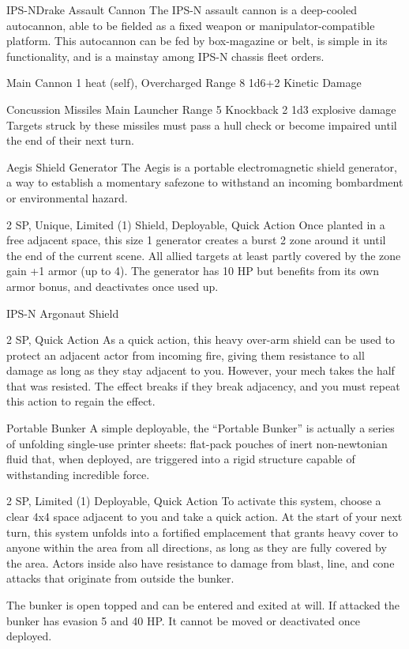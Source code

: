 \begin{mech}{IPS-N}{Drake}
Assault Cannon
The IPS-N assault cannon is a deep-cooled autocannon, able to be fielded as a fixed weapon or manipulator-compatible platform. This autocannon can be fed by box-magazine or belt, is simple in its functionality, and is a mainstay among IPS-N chassis fleet orders.

Main Cannon
1 heat (self), Overcharged
Range 8
1d6+2 Kinetic Damage

Concussion Missiles
Main Launcher
Range 5
Knockback 2
1d3 explosive damage
Targets struck by these missiles must pass a hull check or become impaired until the end of their next turn.

Aegis Shield Generator
The Aegis is a portable electromagnetic shield generator, a way to establish a momentary safezone to withstand an incoming bombardment or environmental hazard.

2 SP, Unique, Limited (1)
Shield, Deployable, Quick Action
Once planted in a free adjacent space, this size 1 generator creates a burst 2 zone around it until the end of the current scene. All allied targets at least partly covered by the zone gain +1 armor (up to 4). The generator has 10 HP but benefits from its own armor bonus, and deactivates once used up.

IPS-N Argonaut Shield

2 SP, Quick Action
As a quick action, this heavy over-arm shield can be used to protect an adjacent actor from incoming fire, giving them resistance to all damage as long as they stay adjacent to you. However, your mech takes the half that was resisted. The effect breaks if they break adjacency, and you must repeat this action to regain the effect.

Portable Bunker
A simple deployable, the “Portable Bunker” is actually a series of unfolding single-use printer sheets: flat-pack pouches of inert non-newtonian fluid that, when deployed, are triggered into a rigid structure capable of withstanding incredible force.

2 SP, Limited (1)
Deployable, Quick Action
To activate this system, choose a clear 4x4 space adjacent to you and take a quick action. At the start of your next turn, this system unfolds into a fortified emplacement that grants heavy cover to anyone within the area from all directions, as long as they are fully covered by the area. Actors inside also have resistance to damage from blast, line, and cone attacks that originate from outside the bunker.

The bunker is open topped and can be entered and exited at will. If attacked the bunker has evasion 5 and 40 HP. It cannot be moved or deactivated once deployed.


\end{mech}
